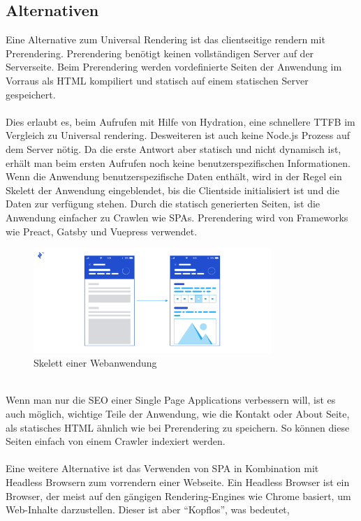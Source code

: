 \documentclass[runningheads]{llncs}
\begin{document}
\subsection{Alternativen}
\label{subsec:Alternativen}
Eine Alternative zum Universal Rendering ist das clientseitige rendern mit Prerendering. 
Prerendering benötigt keinen vollständigen Server auf der Serverseite. 
Beim Prerendering werden vordefinierte Seiten der Anwendung im Vorraus als HTML kompiliert und 
statisch auf einem statischen Server gespeichert. 
\\
\\
Dies erlaubt es, beim Aufrufen mit Hilfe von Hydration, 
eine schnellere TTFB im Vergleich zu Universal rendering. 
Desweiteren ist auch keine Node.js Prozess auf dem Server nötig. 
Da die erste Antwort aber statisch und nicht dynamisch ist, 
erhält man beim ersten Aufrufen noch keine benutzerspezifischen Informationen. 
Wenn die Anwendung benutzerspezifische Daten enthält, 
wird in der Regel ein Skelett der Anwendung eingeblendet, 
bis die Clientside initialisiert ist und die Daten zur verfügung stehen. 
Durch die statisch generierten Seiten, 
ist die Anwendung einfacher zu Crawlen wie SPAs. 
Prerendering wird von Frameworks wie Preact, 
Gatsby und Vuepress verwendet.
\begin{figure}[h]
  \centering
  \includegraphics[width=9cm]{images/WebsiteSceleton}
  \caption{Skelett einer Webanwendung \cite{breux_2018}}
\end{figure}
\\
Wenn man nur die SEO einer Single Page Applications verbessern will, 
ist es auch möglich, 
wichtige Teile der Anwendung, 
wie die Kontakt oder About Seite, 
als statisches HTML ähnlich wie bei Prerendering zu speichern. 
So können diese Seiten einfach von einem Crawler indexiert werden.
\\
\\
Eine weitere Alternative ist das Verwenden von SPA in Kombination mit Headless Browsern zum vorrendern einer Webseite. 
Ein Headless Browser ist ein Browser, 
der meist auf den gängigen Rendering-Engines wie Chrome basiert, 
um Web-Inhalte darzustellen. Dieser ist aber “Kopflos”, was bedeutet, 
\end{document}

